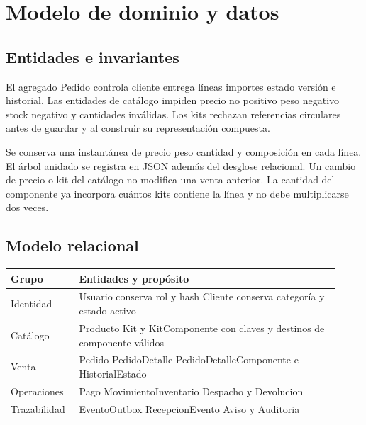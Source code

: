 
\section{Modelo de dominio y datos}
\subsection{Entidades e invariantes}
El agregado Pedido controla cliente entrega líneas importes estado versión e historial. Las entidades de catálogo impiden precio no positivo peso negativo stock negativo y cantidades inválidas. Los kits rechazan referencias circulares antes de guardar y al construir su representación compuesta.

Se conserva una instantánea de precio peso cantidad y composición en cada línea. El árbol anidado se registra en JSON además del desglose relacional. Un cambio de precio o kit del catálogo no modifica una venta anterior. La cantidad del componente ya incorpora cuántos kits contiene la línea y no debe multiplicarse dos veces.

\FloatBarrier
\subsection{Modelo relacional}
\FloatBarrier
\begingroup\small
\noindent
\begin{tabular}{@{}>{\raggedright\arraybackslash}p{0.18\linewidth}>{\raggedright\arraybackslash}p{0.74\linewidth}@{}}
\toprule
\textbf{Grupo} & \textbf{Entidades y propósito}\\
\midrule
Identidad & Usuario conserva rol y hash Cliente conserva categoría y estado activo\\[3pt]
Catálogo & Producto Kit y KitComponente con claves y destinos de componente válidos\\[3pt]
Venta & Pedido PedidoDetalle PedidoDetalleComponente e HistorialEstado\\[3pt]
Operaciones & Pago MovimientoInventario Despacho y Devolucion\\[3pt]
Trazabilidad & EventoOutbox RecepcionEvento Aviso y Auditoria\\[3pt]
\bottomrule
\end{tabular}
\par\endgroup

